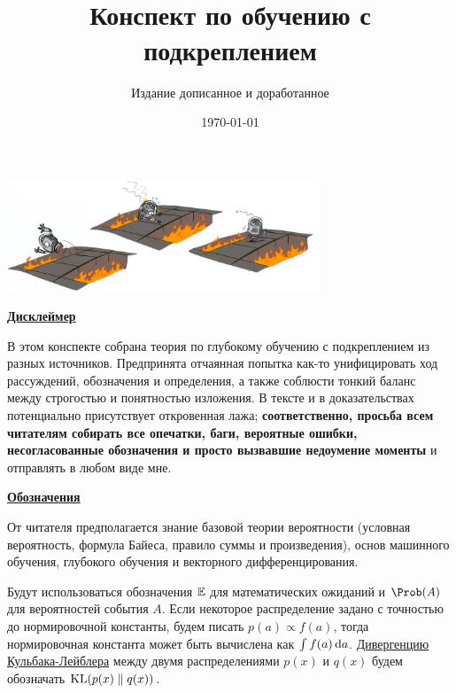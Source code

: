 \documentclass[a4paper, 10pt, oneside]{memoir}
\title{
\vspace{4cm}
\normalfont \normalsize 
\horrule{0.5pt} \\[0.4cm]
\huge Конспект по обучению с подкреплением
\horrule{2pt} \\[0.5cm]
}
\author{Издание дописанное и доработанное}
\date{\normalsize\today}
\begin{document}

\maketitle
\thispagestyle{empty}

\begin{center}
    \includegraphics[width=0.7\textwidth]{Images/robot.png}
\end{center}

\vspace{2cm}
\begin{center}
\textcolor{ChadBlue}{\underline{\textbf{Дисклеймер}}}
\end{center}

\vspace{0.75cm}
В этом конспекте собрана теория по глубокому обучению с подкреплением из разных источников. Предпринята отчаянная попытка как-то унифицировать ход рассуждений, обозначения и определения, а также соблюсти тонкий баланс между строгостью и понятностью изложения. В тексте и в доказательствах потенциально присутствует откровенная лажа; \textbf{соответственно, просьба всем читателям собирать все опечатки, баги, вероятные ошибки, несогласованные обозначения и просто вызвавшие недоумение моменты} и отправлять в любом виде мне.

\newpage
\begin{center}
\textcolor{ChadBlue}{\underline{\textbf{Обозначения}}}
\end{center}

\vspace{0.5cm}
От читателя предполагается знание базовой теории вероятности (условная вероятность, формула Байеса, правило суммы и произведения), основ машинного обучения, глубокого обучения и векторного дифференцирования. 

Будут использоваться обозначения $\mathbb{E}$ для математических ожиданий и $\Prob(A)$ для вероятностей события $A$. Если некоторое распределение задано с точностью до нормировочной константы, будем писать $p(a) \propto f(a)$, тогда нормировочная константа может быть вычислена как $\int f(a) \mathop{}\!\mathrm{d} a$. \href{https://ru.wikipedia.org/wiki/\%D0\%A0\%D0\%B0\%D1\%81\%D1\%81\%D1\%82\%D0\%BE\%D1\%8F\%D0\%BD\%D0\%B8\%D0\%B5_\%D0\%9A\%D1\%83\%D0\%BB\%D1\%8C\%D0\%B1\%D0\%B0\%D0\%BA\%D0\%B0_\%E2\%80\%94_\%D0\%9B\%D0\%B5\%D0\%B9\%D0\%B1\%D0\%BB\%D0\%B5\%D1\%80\%D0\%B0}{Дивергенцию Кульбака-Лейблера} между двумя распределениями $p(x)$ и $q(x)$ будем обозначать $\operatorname{KL}(p(x) \parallel q(x))$.
\end{document}
